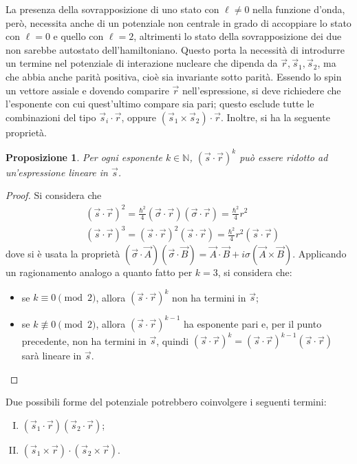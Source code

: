 \documentclass[11pt, a4paper]{scrartcl}
\theoremstyle{style}
\newtheorem{prop}{Proposizione}[section]
\numberwithin{equation}{subsection}
\begin{document}
La presenza della sovrapposizione di uno stato con $\ell \neq 0$ nella funzione d'onda, per\`o, necessita anche di un potenziale non centrale in grado di accoppiare lo stato con $\ell =0$ e quello con $\ell =2$, altrimenti lo stato della sovrapposizione dei due non sarebbe autostato dell'hamiltoniano.
Questo porta la necessit\`a di introdurre un termine nel potenziale di interazione nucleare che dipenda da $\vec{r}, \vec{s}_1, \vec{s}_2$, ma che abbia anche parit\`a positiva, cio\`e sia invariante sotto parit\`a.
Essendo lo spin un vettore assiale e dovendo comparire $\vec{r}$ nell'espressione, si deve richiedere che l'esponente con cui quest'ultimo compare sia pari; questo esclude tutte le combinazioni del tipo $\vec{s}_i \cdot \vec{r}$, oppure $(\vec{s}_1 \times \vec{s}_2) \cdot \vec{r}$.
Inoltre, si ha la seguente propriet\`a.
\begin{prop}\label{prop1}
Per ogni esponente $k \in \mathbb{N}$, $(\vec{s}\cdot \vec{r})^k$ pu\`o essere ridotto ad un'espressione lineare in $\vec{s}$.
\end{prop}
\begin{proof}
Si considera che
\[
\begin{split}
	&(\vec{s}\cdot \vec{r})^2 = \frac{\hbar ^2}{4} (\vec{\sigma }\cdot \vec{r}) (\vec{\sigma} \cdot \vec{r}) = \frac{\hbar ^2}{4}r^2\\
	&(\vec{s}\cdot \vec{r})^3 = (\vec{s}\cdot \vec{r})^2 (\vec{s}\cdot \vec{r}) = \frac{\hbar ^2}{4}r^2 (\vec{s}\cdot \vec{r})
\end{split}
\] 
dove si \`e usata la propriet\`a $(\vec{\sigma }\cdot \vec{A}) (\vec{\sigma }\cdot \vec{B}) = \vec{A}\cdot \vec{B} + i \sigma (\vec{A}\times \vec{B})$.
Applicando un ragionamento analogo a quanto fatto per $k=3$, si considera che:
\begin{itemize}
	\item se $k\equiv 0 \pmod{2} $, allora $(\vec{s}\cdot \vec{r})^k$ non ha termini in $\vec{s}$;
	\item se $k\not\equiv 0 \pmod{2} $, allora $(\vec{s}\cdot \vec{r})^{k-1}$ ha esponente pari e, per il punto precedente, non ha termini in $\vec{s}$, quindi $(\vec{s}\cdot \vec{r})^{k} = (\vec{s}\cdot \vec{r})^{k-1} (\vec{s}\cdot \vec{r})$ sar\`a lineare in $\vec{s}$.
\end{itemize}
\end{proof}
\noindent Due possibili forme del potenziale potrebbero coinvolgere i seguenti termini:
\begin{enumerate}[(I).]
	\item $(\vec{s}_1\cdot \vec{r})(\vec{s}_2 \cdot \vec{r})$;
	\item $(\vec{s}_1 \times \vec{r}) \cdot (\vec{s}_2 \times \vec{r})$.
\end{enumerate}
\end{document}
